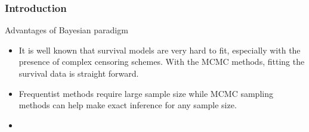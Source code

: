 \documentclass{beamer}
\begin{document}
	\begin{frame}
		\frametitle{Introduction}
		Advantages of Bayesian paradigm
		\begin{itemize}
			\item It is well known that survival models are very hard to fit, especially with the presence of complex censoring schemes. With the MCMC methods, fitting the survival data is straight forward.
			\item Frequentist methods require large sample size while MCMC sampling methods can help make exact inference for any sample size.
			\item  
		\end{itemize}
	\end{frame}
	
	\begin{frame}[allowframebreaks]
		\begin{singlespace}
			
			
		\end{singlespace}
	\end{frame}
	
\end{document}
